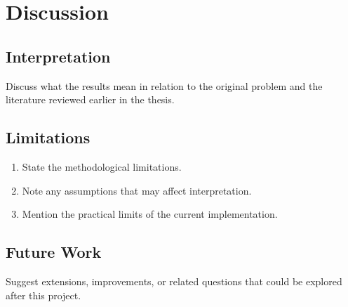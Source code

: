 \chapter{Discussion}

\section{Interpretation}

Discuss what the results mean in relation to the original problem and the literature reviewed earlier in the thesis.

\section{Limitations}

\begin{enumerate}
    \item State the methodological limitations.
    \item Note any assumptions that may affect interpretation.
    \item Mention the practical limits of the current implementation.
\end{enumerate}

\section{Future Work}

Suggest extensions, improvements, or related questions that could be explored after this project.
